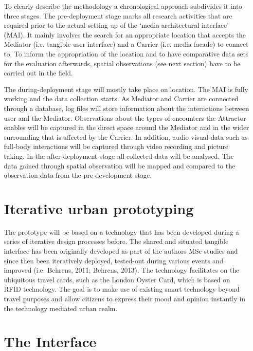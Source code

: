 To clearly describe the methodology a chronological approach subdivides it into three stages. The pre-deployment stage marks all research activities that are required prior to the actual setting up of the ‘media architectural interface’ (MAI). It mainly involves the search for an appropriate location that accepts the Mediator (i.e. tangible user interface) and a Carrier (i.e. media facade) to connect to. To inform the appropriation of the location and to have comparative data sets for the evaluation afterwards, spatial observations (see next section) have to be carried out in the field. 

The during-deployment stage will mostly take place on location. The MAI is fully working and the data collection starts. As Mediator and Carrier are connected through a database, log files will store information about the interactions between user and the Mediator. Observations about the types of encounters the Attractor enables will be captured in the direct space around the Mediator and in the wider surrounding that is affected by the Carrier. In addition, audio-visual data such as full-body interactions will be captured through video recording and picture taking. 
In the after-deployment stage all collected data will be analysed. The data gained through spatial observation will be mapped and compared to the observation data from the pre-development stage.


\section{Iterative urban prototyping}

The prototype will be based on a technology that has been developed during a series of iterative design processes before. The shared and situated tangible interface has been originally developed as part of the authors MSc studies and since then been iteratively deployed, tested-out during various events and improved (i.e. Behrens, 2011; Behrens, 2013). The technology facilitates on the ubiquitous travel cards, such as the London Oyster Card, which is based on RFID technology. The goal is to make use of existing smart technology beyond travel purposes and allow citizens to express their mood and opinion instantly in the technology mediated urban realm.

\section{The Interface}

